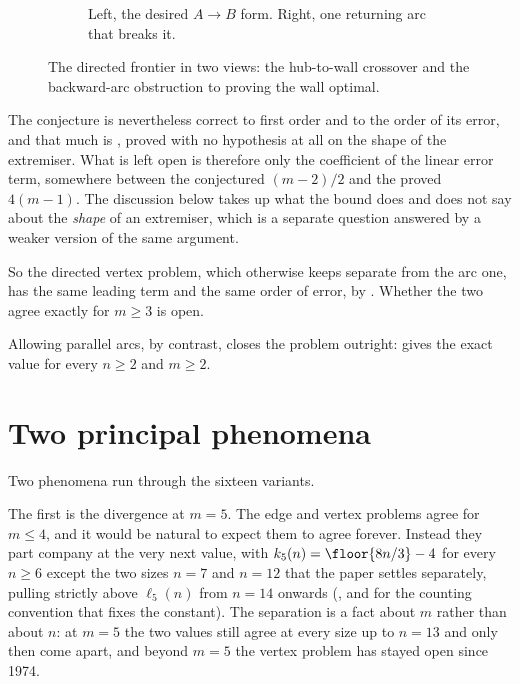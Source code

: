\begin{figure}[t]
\begin{subfigure}[b]{0.72\textwidth}
{
}%
\caption{Left, the desired $A\to B$ form. Right, one returning arc that breaks it.}
\label{fig:backward-arc}
    \end{subfigure}
\caption{The directed frontier in two views: the hub-to-wall crossover and the backward-arc obstruction to proving the wall optimal.}
\label{fig:directed-frontier-pair}
\end{figure}

The conjecture is nevertheless correct to first order and to the order of its error, and that much is , proved with no hypothesis at all on the shape of the extremiser. What is left open is therefore only the coefficient of the linear error term, somewhere between the conjectured $(m-2)/2$ and the proved $4(m-1)$. The discussion below takes up what the bound does and does not say about the \emph{shape} of an extremiser, which is a separate question answered by a weaker version of the same argument.

So the directed vertex problem, which  otherwise keeps separate from the arc one, has the same leading term and the same order of error, by . Whether the two agree exactly for $m \ge 3$ is open.

Allowing parallel arcs, by contrast, closes the problem outright:  gives the exact value for every $n \ge 2$ and $m \ge 2$.

\section{Two principal phenomena}

Two phenomena run through the sixteen variants.

The first is the divergence at $m = 5$. The edge and vertex problems agree for $m \le 4$, and it would be natural to expect them to agree forever. Instead they part company at the very next value, with $k_5(n) = \floor{8n/3} - 4$ for every $n \ge 6$ except the two sizes $n = 7$ and $n = 12$ that the paper settles separately, pulling strictly above $\ell_5(n)$ from $n = 14$ onwards (, and  for the counting convention that fixes the constant). The separation is a fact about $m$ rather than about $n$: at $m = 5$ the two values still agree at every size up to $n = 13$ and only then come apart, and beyond $m = 5$ the vertex problem has stayed open since 1974.

